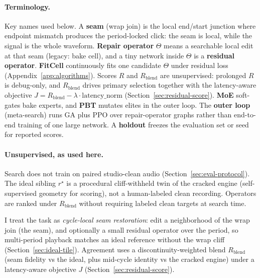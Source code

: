 \paragraph{Terminology.}
Key names used below.
A \textbf{seam} (wrap join) is the local end/start junction where endpoint mismatch produces the period-locked click: the seam is local, while the signal is the whole waveform.
\textbf{Repair operator} $\Theta$ means a searchable local edit at that seam (legacy: bake cell), and a tiny network inside $\Theta$ is a \textbf{residual operator}.
\textbf{FitCell} continuously fits one candidate $\Theta$ under residual loss (Appendix~\ref{app:algorithms}).
Scores $R$ and $R_{\mathrm{blend}}$ are unsupervised: prolonged $R$ is debug-only, and $R_{\mathrm{blend}}$ drives primary selection together with the latency-aware objective $J=R_{\mathrm{blend}}-\lambda\cdot\mathrm{latency\_norm}$ (Section~\ref{sec:residual-score}).
\textbf{MoE} soft-gates bake experts, and \textbf{PBT} mutates elites in the outer loop.
The \textbf{outer loop} (meta-search) runs GA plus PPO over repair-operator graphs rather than end-to-end training of one large network.
A \textbf{holdout} freezes the evaluation set or seed for reported scores.

\paragraph{Unsupervised, as used here.}
Search does not train on paired studio-clean audio (Section~\ref{sec:eval-protocol}).
The ideal sibling $r^{\star}$ is a procedural cliff-withheld twin of the cracked engine (self-supervised geometry for scoring), not a human-labeled clean recording.
Operators are ranked under $R_{\mathrm{blend}}$ without requiring labeled clean targets at search time.

I treat the task as \emph{cycle-local seam restoration}: edit a neighborhood of the wrap join (the seam), and optionally a small residual operator over the period, so multi-period playback matches an ideal reference without the wrap cliff (Section~\ref{sec:ideal-tile}).
Agreement uses a discontinuity-weighted blend $R_{\mathrm{blend}}$ (seam fidelity vs the ideal, plus mid-cycle identity vs the cracked engine) under a latency-aware objective $J$ (Section~\ref{sec:residual-score}).

